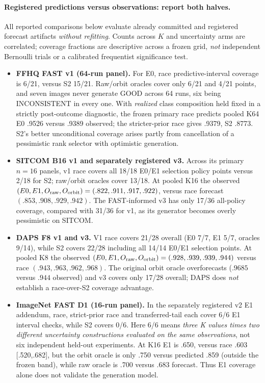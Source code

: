 \paragraph{Registered predictions versus observations: report both halves.}
All reported comparisons below evaluate already committed and
registered forecast artifacts \emph{without refitting}.
Counts across $K$ and uncertainty arms are correlated; coverage
fractions are descriptive across a frozen grid, \emph{not}
independent Bernoulli trials or a calibrated frequentist
significance test.
\begin{itemize}
\item \textbf{FFHQ FAST v1 (64-run panel).}
For E0, race predictive-interval coverage is 6/21, versus S2
15/21. Raw/orbit oracles cover only 6/21 and 4/21 points, and
seven images never generate GOOD across 64 runs, six being
INCONSISTENT in every one. With \emph{realized} class composition
held fixed in a strictly post-outcome diagnostic, the frozen primary
race predicts pooled K64 E0 .9526 versus .9389 observed;
the stricter-prior race gives .9379, S2 .8773. S2's better
unconditional coverage arises partly from cancellation of a
pessimistic rank selector with optimistic generation.
\item \textbf{SITCOM B16 v1 and separately registered v3.}
Across its primary $n=16$ panels, v1 race covers all 18/18 E0/E1
selection policy points versus 2/18 for S2; raw/orbit oracles
cover 13/18. At pooled K16 the observed
$(E0,E1,O_{\rm raw},O_{\rm orbit})=(.822,.911,.917,.922)$,
versus race forecast $(.853,.908,.929,.942)$. The FAST-informed
v3 has only 17/36 all-policy coverage, compared with 31/36
for v1, as its generator becomes overly pessimistic on SITCOM.
\item \textbf{DAPS F8 v1 and v3.}
V1 race covers 21/28 overall (E0 7/7, E1 5/7, oracles 9/14),
while S2 covers 22/28 including all 14/14 E0/E1 selection
points. At pooled K8 the observed
$(E0,E1,O_{\rm raw},O_{\rm orbit})=(.928,.939,.939,.944)$
versus race $(.943,.963,.962,.968)$. The original orbit
oracle overforecasts ($.9685$ versus $.944$ observed) and v3
covers only 17/28 overall; DAPS does \emph{not} establish a
race-over-S2 coverage advantage.
\item \textbf{ImageNet FAST D1 (16-run panel).}
In the separately registered v2 E1 addendum, race, strict-prior
race and transferred-tail each cover 6/6 E1 interval checks,
while S2 covers 0/6. Here 6/6 means \emph{three K values times
two different uncertainty constructions evaluated on the same
observations}, not six independent held-out experiments.
At K16 E1 is .650, versus race .603 [.520,.682], but the
orbit oracle is only .750 versus predicted .859 (outside the
frozen band), while raw oracle is .700 versus .683 forecast.
Thus E1 coverage alone does not validate the generation model.
\end{itemize}

